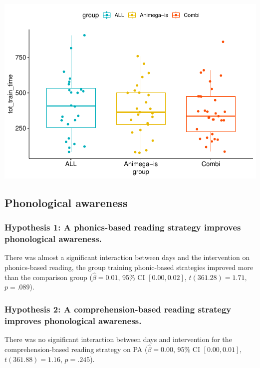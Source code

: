 \documentclass[
  ,
]{article}
\begin{document}
\includegraphics{Effects_of_training_files/figure-latex/tottraintime-plot-1.pdf}

\hypertarget{phonological-awareness-1}{%
\subsection{Phonological awareness}\label{phonological-awareness-1}}

\hypertarget{hypothesis-1-a-phonics-based-reading-strategy-improves-phonological-awareness.}{%
\subsubsection{Hypothesis 1: A phonics-based reading strategy improves
phonological
awareness.}\label{hypothesis-1-a-phonics-based-reading-strategy-improves-phonological-awareness.}}

There was almost a significant interaction between days and the
intervention on phonics-based reading, the group training phonic-based
strategies improved more than the comparison group
(\(\hat{\beta} = 0.01\), 95\% CI \([0.00, 0.02]\), \(t(361.28) = 1.71\),
\(p = .089\)).

\hypertarget{hypothesis-2-a-comprehension-based-reading-strategy-improves-phonological-awareness.}{%
\subsubsection{Hypothesis 2: A comprehension-based reading strategy
improves phonological
awareness.}\label{hypothesis-2-a-comprehension-based-reading-strategy-improves-phonological-awareness.}}

There was no significant interaction between days and intervention for
the comprehension-based reading strategy on PA (\(\hat{\beta} = 0.00\),
95\% CI \([0.00, 0.01]\), \(t(361.88) = 1.16\), \(p = .245\)).
\end{document}
